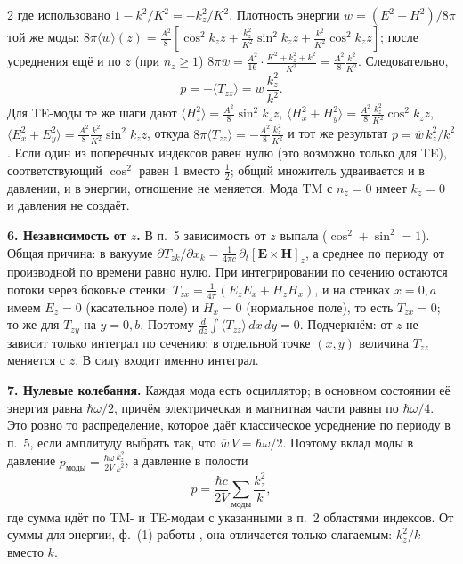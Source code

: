 \documentclass[twoside, 10pt]{article}
\begin{document}
\begin{multicols}{2}
\noindent где использовано $1-k^2/K^2=-k_z^2/K^2$. Плотность энергии
$w=(E^2+H^2)/8\pi$ той же моды:
$8\pi\langle w\rangle(z)=\frac{A^2}{8}\left[\cos^2k_zz+\frac{k_z^2}{K^2}\sin^2k_zz+\frac{k^2}{K^2}\cos^2k_zz\right]$;
после усреднения ещё и по $z$ (при $n_z\ge1$)
$8\pi\overline w=\frac{A^2}{16}\cdot\frac{K^2+k_z^2+k^2}{K^2}=\frac{A^2}{8}\frac{k^2}{K^2}$.
Следовательно,
\[
p=-\langle T_{zz}\rangle=\overline w\,\frac{k_z^2}{k^2}.
\]
Для TE-моды те же шаги дают
$\langle H_z^2\rangle=\frac{A^2}{8}\sin^2k_zz$,
$\langle H_x^2+H_y^2\rangle=\frac{A^2}{8}\frac{k_z^2}{K^2}\cos^2k_zz$,
$\langle E_x^2+E_y^2\rangle=\frac{A^2}{8}\frac{k^2}{K^2}\sin^2k_zz$, откуда
$8\pi\langle T_{zz}\rangle=-\frac{A^2}{8}\frac{k_z^2}{K^2}$ и тот же результат
$p=\overline w\,k_z^2/k^2$. Если один из поперечных индексов равен нулю (это
возможно только для TE), соответствующий $\cos^2$ равен $1$ вместо $\tfrac12$;
общий множитель удваивается и в давлении, и в энергии, отношение не меняется.
Мода TM с $n_z=0$ имеет $k_z=0$ и давления не создаёт.

\textbf{6. Независимость от $z$.} В п.~5 зависимость от $z$ выпала
($\cos^2+\sin^2=1$). Общая причина: в вакууме
$\partial T_{zk}/\partial x_k=\frac1{4\pi c}\,\partial_t[\mathbf E\times\mathbf H]_z$,
а среднее по периоду от производной по времени равно нулю. При интегрировании
по сечению остаются потоки через боковые стенки:
$T_{zx}=\frac1{4\pi}(E_zE_x+H_zH_x)$, и на стенках $x=0,a$ имеем $E_z=0$
(касательное поле) и $H_x=0$ (нормальное поле), то есть $T_{zx}=0$; то же для
$T_{zy}$ на $y=0,b$. Поэтому
$\frac{d}{dz}\int\langle T_{zz}\rangle\,dx\,dy=0$. Подчеркнём: от $z$ не зависит
только интеграл по сечению; в отдельной точке $(x,y)$ величина $T_{zz}$ меняется
с $z$. В силу входит именно интеграл.

\textbf{7. Нулевые колебания.} Каждая мода есть осциллятор; в основном состоянии
её энергия равна $\hbar\omega/2$, причём электрическая и магнитная части равны
по $\hbar\omega/4$. Это ровно то распределение, которое даёт классическое
усреднение по периоду в п.~5, если амплитуду выбрать так, что
$\overline w\,V=\hbar\omega/2$. Поэтому вклад моды в давление
$p_{\text{моды}}=\frac{\hbar\omega}{2V}\frac{k_z^2}{k^2}$, а давление в полости
\[
p=\frac{\hbar c}{2V}\sum_{\text{моды}}\frac{k_z^2}{k},
\]
где сумма идёт по TM- и TE-модам с указанными в п.~2 областями индексов.
От суммы для энергии, ф.~(1) работы \cite{Drozdov2024}, она отличается только
слагаемым: $k_z^2/k$ вместо $k$.


\end{multicols}
\end{document}
